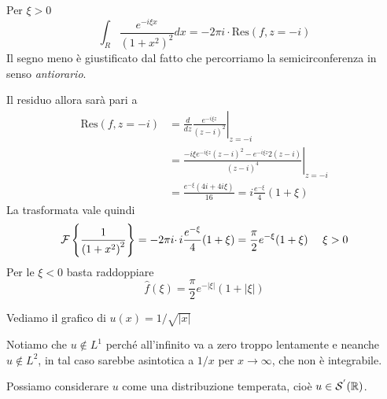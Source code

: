 Per $\xi  >0$
\begin{equation*}
\int _{R}\frac{e^{-i\xi x}}{\left( 1+x^{2}\right)^{2}} dx=-2\pi i\cdotp \mathrm{Res}( f,z=-i)
\end{equation*}
Il segno meno è giustificato dal fatto che percorriamo la semicirconferenza in senso \textit{antiorario}.

Il residuo allora sarà pari a
\begin{equation*}
\begin{aligned}
\mathrm{Res}( f,z=-i) & =\left. \frac{d}{dz}\frac{e^{-i\xi z}}{( z-i)^{2}}\right| _{z=-i}\\
 & =\left. \frac{-i\xi e^{-i\xi z}( z-i)^{2} -e^{-i\xi z} 2(z-i)}{( z-i)^{4}}\right| _{z=-i}\\
 & =\frac{e^{-\xi }( 4i+4i\xi )}{16} =i\frac{e^{-\xi }}{4} (1+\xi )
\end{aligned}
\end{equation*}
La trasformata vale quindi
\begin{equation*}
\mathcal{F} \left\{\frac{1}{\left( 1+x^{2}\right)^{2}}\right\} =-2\pi i\cdotp i\frac{e^{-\xi }}{4} (1+\xi )=\frac{\pi }{2} e^{-\xi }( 1+\xi ) \ \ \ \ \xi  >0
\end{equation*}
Per le $\xi < 0$ basta raddoppiare
\begin{equation*}
\hat{f}( \xi ) =\frac{\pi }{2} e^{-| \xi | } (1+| \xi | )
\end{equation*}
\Soluzione

Vediamo il grafico di $u(x)=1/\sqrt{|x|}$


Notiamo che $u\notin L^{1}$ perché all'infinito va a zero troppo lentamente e neanche $u\notin L^{2}$, in tal caso sarebbe asintotica a $1/x$ per $x\rightarrow \infty $, che non è integrabile.

Possiamo considerare $u$ come una distribuzione temperata, cioè $u\in \mathcal{S} ^{'}(\mathbb{R})$.

